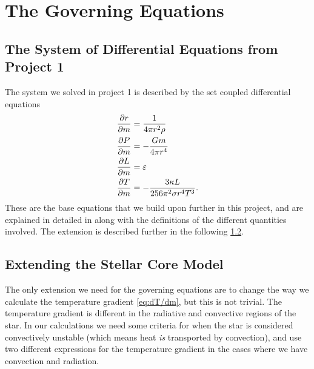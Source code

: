 \documentclass[11pt,a4paper,twocolumn,titlepage]{article}
\begin{document}
\section{The Governing Equations}\label{sec:Governing_equations}
\subsection{The System of Differential Equations from Project 1}\label{subsec:Governing/Project1_System}
The system we solved in project 1 is described by the set coupled differential equations
\begin{align}
\pdv{r}{m} &= \frac{1}{4\pi r^2 \rho} \label{eq:dr/dm}
\\
\pdv{P}{m} &= -\frac{Gm}{4\pi r^4} \label{eq:dP/dm} %
\\
\pdv{L}{m} &= \varepsilon    \label{eq:dL/dm}
\\
\pdv{T}{m} &= -\frac{3\kappa L}{256\pi^2\sigma r^4T^3}. \label{eq:dT/dm}
\end{align}
These are the base equations that we build upon further in this project, and are explained in detailed in \cite{Project1} along with the definitions of the different quantities involved. The extension is described further in the following \cref{subsec:Governing/Extending_project}.

\subsection{Extending the Stellar Core Model}\label{subsec:Governing/Extending_project}
The only extension we need for the governing equations are to change the way we calculate the temperature gradient \cref{eq:dT/dm}, but this is not trivial. The temperature gradient is different in the radiative and convective regions of the star. In our calculations we need some criteria for when the star is considered convectively unstable (which means heat \textit{is} transported by convection), and use two different expressions for the temperature gradient in the cases where we have convection and radiation. 
\end{document}

